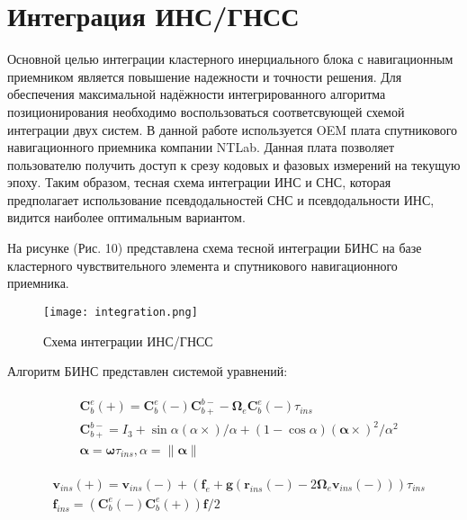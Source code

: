 \newpage
\section {Интеграция ИНС/ГНСС}

 
 Основной целью интеграции кластерного инерциального блока с навигационным приемником является повышение
 надежности и точности решения. Для обеспечения максимальной надёжности интегрированного алгоритма позиционирования необходимо воспользоваться соответсвующей схемой интеграции двух систем. 
 В данной работе используется OEM плата спутникового навигационного приемника компании NTLab. Данная плата позволяет пользователю получить доступ к срезу кодовых и фазовых измерений на текущую эпоху. Таким образом, тесная схема интеграции ИНС и СНС, которая предполагает использование псевдодальностей СНС и псевдодальности ИНС, видится наиболее оптимальным вариантом. 
 
 
 На рисунке (Рис. 10) представлена схема тесной интеграции БИНС на базе кластерного чувствительного элемента и спутникового навигационного приемника. 

 \begin{figure}[h!]
 	\texttt{[image: integration.png]}
 	\label{fig:integration}
 	\caption{\label{fig:cluster_pcb} Схема интеграции ИНС/ГНСС}
 \end{figure}


Алгоритм БИНС представлен системой уравнений: 


	\begin{equation} \label{eq:tr_mat}
		\begin{gathered}
			\begin{split}
				& \bm C_b^e(+) = \bm C_b^e(-) \bm C_{b+}^{b-} - \bm \Omega_e \bm C_b^e(-) \tau_{ins} \\
				&  \bm C_{b+}^{b-} = I_3 + \sin \alpha (\alpha \times) / \alpha + (1 - \cos \alpha )(\bm \alpha \times)^2 / \alpha^2 \\ 
				& \bm \alpha =  \bm \omega\tau_{ins}, \alpha = \parallel \bm \alpha \parallel
			\end{split}
		\end{gathered}
	\end{equation}
	
	\begin{equation}
		\label{eq:vel}
		\begin{split}
			& \bm v_{ins} (+) = \bm v_{ins}(-) + (\bm f_e + \bm g (\bm r_{ins}(-) - 2 \bm \Omega_e \bm v_{ins} (-) ) )  \tau_{ins} \\
			& \bm f_{ins} = (\bm C_b^e(-) \bm C_b^e(+)) \bm f / 2
		\end{split}
	\end{equation}	
	
